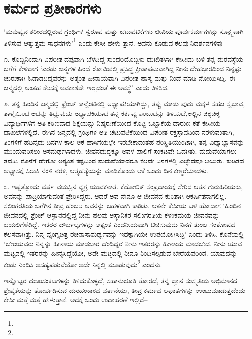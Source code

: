 \section{ಕರ್ಮದ ಪ್ರತೀಕಾರಗಳು}

‘ಮನುಷ್ಯನ ಶರೀರದಲ್ಲಿರುವ ಗ್ರಂಥಿಗಳ ಸ್ವರೂಪ ಮತ್ತು ಚಟುವಟಿಕೆಗಳು ಜೀವಿಯ ಪೂರ್ವಕರ್ಮಗಳನ್ನು ಸೂಕ್ಷ್ಮವಾಗಿ ತಿಳಿಸುವ ಆತ್ಯುತ್ತಮ ಸಾಧನಗಳು’\footnote{} ಎಂದು ಕೇಸೀ ಹೇಳು ತ್ತಾನೆ. ಅವನು ಕೊಡುವ ಕೆಲವು ನಿದರ್ಶನಗಳಿವು–

೧. ಕೊಬ್ಬಿನಿಂದಾಗಿ ವಿಪರೀತ ದಪ್ಪವಾಗಿ ಬೆಳೆದಿದ್ದ ಸುಂದರಿಯೊಬ್ಬಳು ದುಃಖಿತಳಾಗಿ ಕೇಸೀಯ ಬಳಿ ತನ್ನ ದುರವಸ್ಥೆಯ ಬಗೆಗೆ ಕೇಳಿದಾಗ ‘ಎರಡು ಜನ್ಮಗಳ ಹಿಂದೆ ರೋಮಿನಲ್ಲಿ ಪ್ರಸಿದ್ಧ ಕ್ರೀಡಾಪಟುವಾಗಿದ್ದ ನೀನು ದೇಹಭಾರದಿಂದ ನಿನ್ನಷ್ಟು ಚುರುಕಾಗಿ ಓಡಾಡದಿದ್ದವರನ್ನು ಅತ್ಯಂತ ಹೀನಾಯವಾಗಿ ವಿಪರೀತ ಹಾಸ್ಯ ಮತ್ತು ನಿಂದೆ ಮಾಡಿ ನೋಯಿಸಿದ್ದಿ. ಈ ಜನ್ಮದಲ್ಲಿ ಅಂತಹ ಕೆಲಸಕ್ಕೆ ಅವಕಾಶವೇ ಇಲ್ಲದಂತೆ ಈ ಅವಸ್ಥೆ’ ಎಂದು ತಿಳಿಸಿದ.

೨. ತನ್ನ ಹಿಂದಿನ ಜನ್ಮದಲ್ಲಿ ಫ್ರೆಂಚ್ ಕಾನ್ವೆಂಟಿನಲ್ಲಿ ಅಧ್ಯಾಪಕಿಯಾಗಿದ್ದು, ತಪ್ಪು ಮಾಡು ವುದು ಮಕ್ಕಳ ಸಹಜ ಸ್ವಭಾವ, ತಾಳ್ಮೆಯಿಂದ ಅದನ್ನು ತಿದ್ದುವುದು ಅಧ್ಯಾಪಕಿಯಾದ ತನ್ನ ಕರ್ತವ್ಯ ಎಂಬುದನ್ನು ತಿಳಿಯದೆ,ಅಲ್ಲಿನ ಚಿಕ್ಕಚಿಕ್ಕ ವಿದ್ಯಾರ್ಥಿಗಳಿಗೆ ಅತಿ ಕಠಿಣವಾದ ಶಿಕ್ಷೆಯನ್ನು ನಿಷ್ಕರುಣೆಯಿಂದ ಕೊಟ್ಟ ಒಬ್ಬಾಕೆಯ ದಾರುಣ ಕತೆ ಕೇಸೀಯ ದಾಖಲೆಗಳಲ್ಲಿದೆ. ಈಗಿನ ಜನ್ಮದಲ್ಲಿ ಗ್ರಂಥಿಗಳ ಅತಿ ಚಟುವಟಿಕೆಯಿಂದ ವಿಪರೀತ ರಕ್ತಸ್ರಾವದಿಂದ ನರಳುವಂತಾಗಿ, ತಿಂಗಳಿಗೆ ಹದಿನೈದು ದಿನಗಳ ಕಾಲ ಆಕೆ ಹಾಸಿಗೆಯಲ್ಲೇ ಇರಬೇಕಾದಂತಹ ಪರಿಸ್ಥಿತಿಯುಂಟಾಗಿ, ತನ್ನ ವಿದ್ಯಾಭ್ಯಾಸವನ್ನು ಮುಂದುವರಿಸಲು ಅಸಮರ್ಥಳಾದಳು. ಜೀವನದುದ್ದಕ್ಕೂ ಅವಳ ಪಾಲಿಗೆ ಸಂಕಟವೇ ಒದಗಿತು. ಮದುವೆಯಾಗಲು ತವಕಿಸಿ ಕೊನೆಗೆ ಹೇಗೋ ಅತ್ಯಂತ ಕಷ್ಟದಿಂದ ಮದುವೆಯಾದರೂ ಕೆಲವೇ ದಿನಗಳಲ್ಲಿ ವಿಚ್ಛೇದವೂ ಆಯಿತು. ಕುಡಿತದ ಅಭ್ಯಾಸಕ್ಕೆ ಸಿಲುಕಿ ನರಳಿ ನರಳಿ, ಆತ್ಮಹತ್ಯೆಯನ್ನು ಮಾಡಿಕೊಂಡು ಆಕೆ ಒಂದು ದಿನ ಕಣ್ಮರೆಯಾದಳು.

೩. ಇಪ್ಪತ್ತೊಂದು ವರ್ಷ ವಯಸ್ಸಿನ ವ್ಯಗ್ರ ಯುವಕನಾತ. ಕೆಥೋಲಿಕ್ ಸಂಪ್ರದಾಯಕ್ಕೆ ಸೇರಿದ ಆತನ ಗುರುಹಿರಿಯರು, ಅವನನ್ನು ಪಾದ್ರಿಯಾಗುವಂತೆ ಪ್ರೇರಿಸಿದ್ದರು. ಆದರೆ ಅವ ನೇನೂ ಆ ಜೀವನದ ಕುರಿತಾಗಿ ಆಕರ್ಷಿತನಾಗಲಿಲ್ಲ. ಸಲಿಂಗರತಿಯ ಬಗೆಗಿನ ತೀವ್ರ ಹಂಬಲ ಅವನನ್ನು ಬಹಳವಾಗಿ ಕಾಡಿತು. ಆತನೇ ಕೇಸೀಯ ಬಳಿ ಹೋದಾಗ ‘ಹಿಂದಿನ ಜೀವನದಲ್ಲಿ ಫ್ರೆಂಚ್ ಆಸ್ಥಾನದಲ್ಲಿದ್ದ ನೀನು ಹಲವು ಆಸ್ಥಾನಿಕರ ಸಲಿಂಗರತಿಯ ಕಳಂಕಮಯ ಜೀವನವನ್ನು ಬಯಲಿಗೆಳೆದಿದ್ದೆ. ಇತರರ ದೌರ್ಬಲ್ಯಗಳನ್ನು ಅತ್ಯಂತ ನಿಂದನೀಯವಾಗಿ ಟೀಕಿಸುವುದು ನಿನಗೆ ತುಂಬ ಸಂತೋಷದ ಕೆಲಸವಾಗಿತ್ತು. ನಿನ್ನ ವ್ಯಂಗ್ಯಚಿತ್ರ ರಚನಾಸಾಮರ್ಥ್ಯವನ್ನು ಇದಕ್ಕಾಗಿಯೇ ಉಪಯೋಗಿಸಿದ್ದಿ’ ಎಂದು ತಿಳಿಸಿ, ಕೊನೆಯಲ್ಲಿ ‘ಬೇರೆಯವರು ನಿನ್ನನ್ನು ಹೀನಾಯ ಮಾಡಬಾರ ದೆಂದಿದ್ದರೆ ನೀನು ಇತರರನ್ನು ಹೀನಾಯ ಮಾಡಬೇಡ. ನೀನು ಯಾವ ಮಟ್ಟದಲ್ಲಿ ಇತರರನ್ನು ಹೀನೈಸಿದ್ದೆಯೋ, ಅದೇ ಮಟ್ಟದಲ್ಲಿ ನೀನೂ ನಿಂದಿಸಲ್ಪಡುವೆ ಬೇರೆಯವರಿಂದ. ಯಾವುದನ್ನು ಕಂಡು ನಿಂದಿಸಿ ಅಸಹ್ಯಪಡುವೆಯೋ ಅದೇ ನಿನ್ನಲ್ಲಿ ಮೂಡುವುದು\footnote{} ಎಂದನು.

ಇನ್ನೊಬ್ಬರ ದುಃಖಸಂಕಟಗಳನ್ನು ತಿಳಿದುಕೊಳ್ಳದೆ, ಸಹಾನುಭೂತಿ ತೋರದೆ, ತನ್ನ ಜ್ಞಾನ ಸಂಸ್ಕೃತಿಯ ಅಭಿಮಾನದ ಶ್ರೇಷ್ಠತೆಯನ್ನು ತೋರ್ಪಡಿಸುವ ದುರಹಂಕಾರದ ವರ್ತನೆಯು, ತೀವ್ರ ಕರ್ಮದ ಆಘಾತಗಳನ್ನು ಉಂಟುಮಾಡುತ್ತದೆಂದು ಕೇಸೀ ಮತ್ತೆ ಮತ್ತೆ ಹೇಳುತ್ತಾನೆ. ಅದಕ್ಕೆ ಒಂದು ಉದಾಹರಣೆ ಇಲ್ಲಿದೆ–

